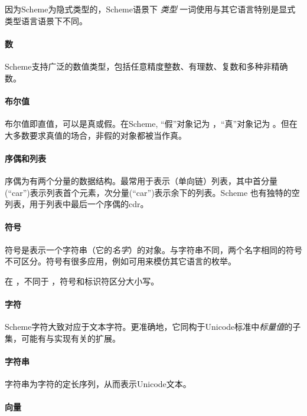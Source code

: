 \begin{note}
  因为Scheme为隐式类型的，Scheme语景下 \textit{类型} 一词使用与其它语言特别是显式类型语言语景下不同。
\end{note}

\paragraph{数}

Scheme支持广泛的数值类型，包括任意精度整数、有理数、复数和多种非精确数。

\paragraph{布尔值}

布尔值即直值，可以是真或假。在Scheme, ``假''对象记为 \schfalse{}，``真''对象记为 \schtrue{}。但在大多数要求真值的场合，非假的对象都被当作真。

\paragraph{序偶和列表}

序偶为有两个分量的数据结构。最常用于表示（单向链）列表，其中首分量(``car'')表示列表首个元素，次分量(``car'')表示余下的列表。Scheme 也有独特的空列表，用于列表中最后一个序偶的cdr。

\paragraph{符号}

符号是表示一个字符串（它的\textit{名字}）的对象。与字符串不同，两个名字相同的符号不可区分。符号有很多应用，例如可用来模仿其它语言的枚举。

在 \rsevenrs，不同于 \rfivers，符号和标识符区分大小写。

\paragraph{字符}

Scheme字符大致对应于文本字符。更准确地，它同构于Unicode标准中\textit{标量值}的子集，可能有与实现有关的扩展。

\paragraph{字符串}

字符串为字符的定长序列，从而表示Unicode文本。

\paragraph{向量}

